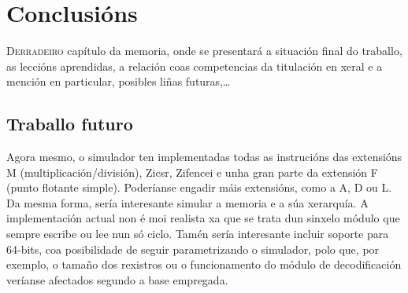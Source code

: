 \chapter{Conclusións}
\label{chap:conclusions}

\lettrine{D}{erradeiro} capítulo da memoria, onde se presentará a situación final do traballo, as leccións aprendidas, a relación coas competencias da titulación en xeral e a mención en particular, posibles liñas futuras,\dots

\section{Traballo futuro}\label{sec:traballo_futuro}
Agora mesmo, o simulador ten implementadas todas as instrucións das extensións M (multiplicación/división), Zicsr, Zifencei e unha gran parte da extensión F (punto flotante simple). Poderíanse engadir máis extensións, como a A, D ou L. Da mesma forma, sería interesante simular a memoria e a súa xerarquía. A implementación actual non é moi realista xa que se trata dun sinxelo módulo que sempre escribe ou lee nun só ciclo. Tamén sería interesante incluir soporte para 64-bits, coa posibilidade de seguir parametrizando o simulador, polo que, por exemplo, o tamaño dos rexistros ou o funcionamento do módulo de decodificación veríanse afectados segundo a base empregada.
